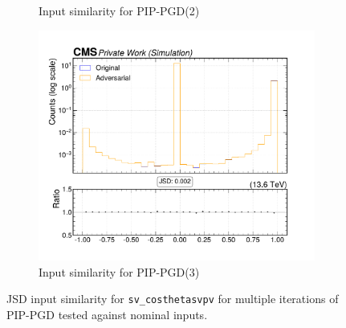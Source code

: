 \begin{figure}[htbp]
\begin{subfigure}[t]{0.32\textwidth}
    \caption*{Input similarity for PIP-PGD(2)}
  \end{subfigure}\hfill
  \begin{subfigure}[t]{0.32\textwidth}
    \includegraphics[width=\linewidth]{media/output/features/compare/combined_it_3/cmp_vtx_arr_sv_costhetasvpv.pdf}
    \caption*{Input similarity for PIP-PGD(3)}
  \end{subfigure}

  \caption*{JSD input similarity for \texttt{sv\_costhetasvpv} for multiple iterations of PIP-PGD tested against nominal inputs.}
  \label{fig:combined_input_sv_costhetasvpv}
\end{figure}

